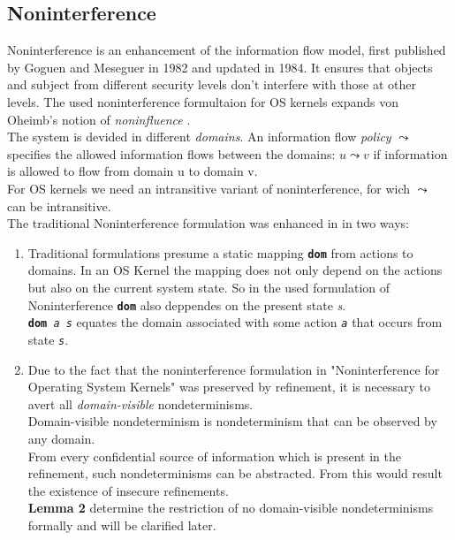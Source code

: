 \documentclass[pdftex,11pt,a4paper]{article}
\begin{document}
	\subsection{Noninterference}
	Noninterference is an enhancement of the information flow model, first published by Goguen and Meseguer in 1982 and updated in 1984. It ensures that objects and subject from different security levels don't interfere with those at other levels.
	The used noninterference formultaion for OS kernels \cite{NonOp} expands von Oheimb's notion of \textit{noninfluence} \cite{Noninf}. \\
	The system is devided in different \textit{domains}. An information flow \textit{policy} $\leadsto$ specifies the allowed information flows between the domains: $u \leadsto v$ if information is allowed to flow from domain u to domain v. \\
	For OS kernels we need an intransitive variant of noninterference, for wich $\leadsto$ can be intransitive. \\
	The traditional Noninterference formulation was enhanced in in two ways: 
	\begin{enumerate}
	\item Traditional formulations presume a static mapping \textbf{\texttt{dom}} from actions to domains. In an OS Kernel the mapping does not only depend on the actions but also on the current system state. So in the used formulation of Noninterference \cite{NonOp} \textbf{\texttt{dom}} also deppendes on the present state \textit{s}. \\
	\texttt{\textbf{dom}\textit{ a s}} equates the domain associated with some action \textit{\texttt{a}} that occurs from state \texttt{\textit{s}}.
	\item Due to the fact that the noninterference formulation in "Noninterference for Operating System Kernels" \cite{NonOp} was preserved by refinement, it is necessary to avert all \textit{domain-visible} nondeterminisms. \\
	Domain-visible nondeterminism is nondeterminism that can be observed by any domain. \\
	From every confidential source of information which is present in the refinement, such nondeterminisms can be abstracted. From this would result the existence of insecure refinements. \\
	\textbf{Lemma 2} \cite{NonOp} determine the restriction of no domain-visible nondeterminisms formally and will be clarified later. 
	\end{enumerate}
	
\end{document}
